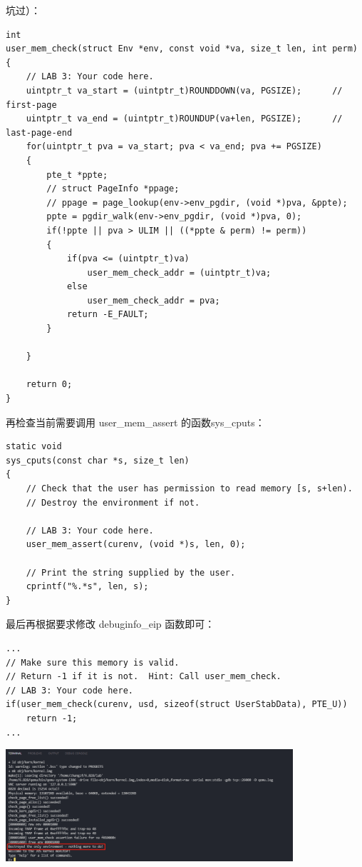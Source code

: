 \documentclass[12pt, letterpaper]{report}
\begin{document}
坑过）：\par
\newpage
\lstset{style=CStyle}
\setmainfont{Consolas}
\begin{lstlisting}
int
user_mem_check(struct Env *env, const void *va, size_t len, int perm)
{
    // LAB 3: Your code here.
    uintptr_t va_start = (uintptr_t)ROUNDDOWN(va, PGSIZE);		// first-page
    uintptr_t va_end = (uintptr_t)ROUNDUP(va+len, PGSIZE);		// last-page-end
    for(uintptr_t pva = va_start; pva < va_end; pva += PGSIZE)
    {
        pte_t *ppte;
        // struct PageInfo *ppage;
        // ppage = page_lookup(env->env_pgdir, (void *)pva, &ppte);
        ppte = pgdir_walk(env->env_pgdir, (void *)pva, 0);
        if(!ppte || pva > ULIM || ((*ppte & perm) != perm))
        {
            if(pva <= (uintptr_t)va)
                user_mem_check_addr = (uintptr_t)va;
            else
                user_mem_check_addr = pva;
            return -E_FAULT;
        }

    }

    return 0;
}
\end{lstlisting}
\setmainfont{Times New Roman}
再检查当前需要调用 user\_mem\_assert 的函数sys\_cputs：\par 
\lstset{style=CStyle}
\setmainfont{Consolas}
\begin{lstlisting}
static void
sys_cputs(const char *s, size_t len)
{
    // Check that the user has permission to read memory [s, s+len).
    // Destroy the environment if not.

    // LAB 3: Your code here.
    user_mem_assert(curenv, (void *)s, len, 0);

    // Print the string supplied by the user.
    cprintf("%.*s", len, s);
}
\end{lstlisting}
\setmainfont{Times New Roman}
\newpage 
最后再根据要求修改 debuginfo\_eip 函数即可：\par 
\lstset{style=CStyle}
\setmainfont{Consolas}
\begin{lstlisting}
...
// Make sure this memory is valid.
// Return -1 if it is not.  Hint: Call user_mem_check.
// LAB 3: Your code here.
if(user_mem_check(curenv, usd, sizeof(struct UserStabData), PTE_U))
    return -1;
...
\end{lstlisting}
\setmainfont{Times New Roman}

\quad \par

{
\centering
\includegraphics[width=0.8\textwidth]{evilhello} \par 
}
\end{document}
